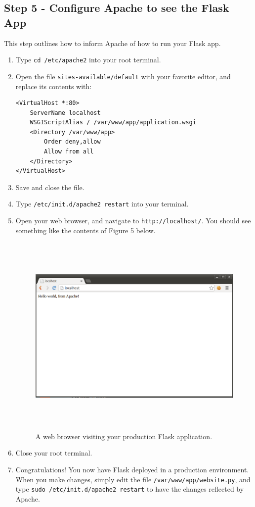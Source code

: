 \documentclass{article}
\begin{document}
\subsection{Step 5 - Configure Apache to see the Flask App}
This step outlines how to inform Apache of how to run your Flask app.
\begin{enumerate}
\item Type \verb+cd /etc/apache2+ into your root terminal.
\item Open the file \verb+sites-available/default+ with your favorite editor, and
replace its contents with:
\begin{verbatim}
<VirtualHost *:80>
	ServerName localhost
    WSGIScriptAlias / /var/www/app/application.wsgi
    <Directory /var/www/app>
        Order deny,allow
        Allow from all
    </Directory>
</VirtualHost>
\end{verbatim}
\item Save and close the file.
\item Type \verb+/etc/init.d/apache2 restart+ into your terminal.
\item Open your web browser, and navigate to \verb+http://localhost/+. You should see something
like the contents of Figure 5 below.

\begin{figure}
\centering \includegraphics[height=10cm]{pic5.png} \caption{A web browser visiting your production Flask application.}
\end{figure}

\item Close your root terminal.
\item Congratulations! You now have Flask deployed in a production environment. When you make
changes, simply edit the file \verb+/var/www/app/website.py+, and type \verb+sudo /etc/init.d/apache2 restart+ to have the changes reflected by Apache.
\end{enumerate}
\end{document}
